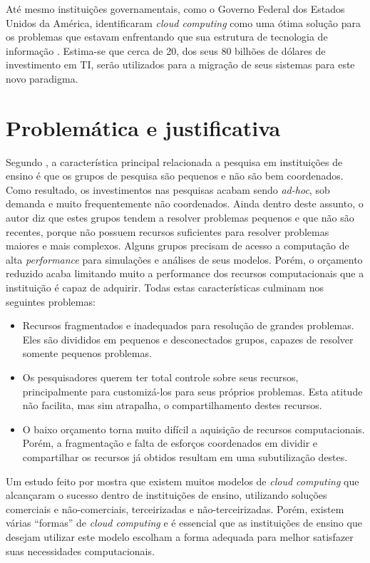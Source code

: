 Até mesmo instituições governamentais, como o Governo Federal dos Estados Unidos da América,
identificaram \emph{cloud computing} como uma ótima solução para os problemas
que estavam enfrentando que sua estrutura de tecnologia de informação \cite{federal-cloud-computing}.
Estima-se que cerca de 20, dos seus 80 bilhões de dólares de investimento em TI,
serão utilizados para a migração de seus sistemas para este novo paradigma.

\section{Problemática e justificativa}

Segundo , a característica principal
relacionada a pesquisa em instituições de ensino é que os grupos de pesquisa são
pequenos e não são bem coordenados. Como resultado, os investimentos nas pesquisas
acabam sendo \textit{ad-hoc}, sob demanda e muito frequentemente não coordenados. Ainda
dentro deste assunto, o autor diz que estes grupos tendem a resolver problemas pequenos e
que não são recentes, porque não possuem recursos suficientes para resolver problemas
maiores e mais complexos. Alguns grupos precisam de acesso a computação  de alta
\emph{performance} para simulações e análises de seus modelos. Porém, o orçamento reduzido
acaba limitando muito a performance dos recursos computacionais que a instituição
é capaz de adquirir. Todas estas características culminam nos seguintes problemas:

\begin{itemize}
    \item
        Recursos fragmentados e inadequados para resolução de grandes problemas. Eles
        são divididos em pequenos e desconectados grupos, capazes de resolver somente
        pequenos problemas.
    \item
        Os pesquisadores querem ter total controle sobre seus recursos, principalmente
        para customizá-los para seus próprios problemas. Esta atitude não facilita, mas sim
        atrapalha, o compartilhamento destes recursos.
    \item
        O baixo orçamento torna muito difícil a aquisição de recursos computacionais.
        Porém, a fragmentação e falta de esforços coordenados em dividir e compartilhar
        os recursos já obtidos resultam em uma subutilização destes.
\end{itemize}

Um estudo feito por  mostra que existem muitos modelos de \emph{cloud computing}
que alcançaram o sucesso dentro de instituições de ensino, utilizando soluções comerciais e não-comerciais, terceirizadas
e não-terceirizadas.
Porém, existem várias ``formas'' de \emph{cloud computing} e é essencial que as instituições de ensino
que desejam utilizar este modelo escolham a forma adequada para melhor satisfazer suas necessidades computacionais.

